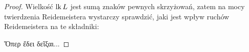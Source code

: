 \begin{proof}
    Wielkość $\operatorname{lk} L$ jest sumą znaków pewnych skrzyżowań, zatem na mocy twierdzenia Reidemeistera wystarczy sprawdzić, jaki jest wpływ ruchów Reidemeistera na te składniki:
\begin{comment}
{\setlength{\intextsep}{4pt plus 2pt minus 2pt}
\begin{figure}[H]
\centering
    \begin{minipage}[b]{.3\linewidth}
        \[
            \MedLarReidemeisterOneLeft \cong \MedLarReidemeisterOneStraight
        \]
        \subcaption{ruch $R_1$}
    \end{minipage}
    \begin{minipage}[b]{.3\linewidth}
        \[
            \MedLarReidemeisterTwoLinkingA \cong \MedLarReidemeisterTwoB
        \]
        \subcaption{ruch $R_2$}
    \end{minipage}
    \begin{minipage}[b]{.35\linewidth}
        \[
            \MedLarReidemeisterThreeLinkingA \cong \MedLarReidemeisterThreeLinkingB
        \]
        \subcaption{ruch $R_3$}
    \end{minipage}
\end{figure}
}
\end{comment}
\noindent
    Ὅπερ ἔδει δεῖξαι...
\end{proof}

%


